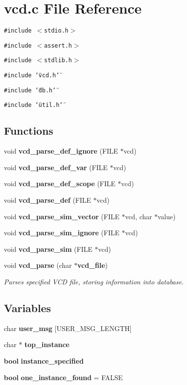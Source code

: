 \section{vcd.c File Reference}
\label{vcd_8c}
{\tt \#include $<$stdio.h$>$}\par
{\tt \#include $<$assert.h$>$}\par
{\tt \#include $<$stdlib.h$>$}\par
{\tt \#include \char`\"{}vcd.h\char`\"{}}\par
{\tt \#include \char`\"{}db.h\char`\"{}}\par
{\tt \#include \char`\"{}util.h\char`\"{}}\par
\subsection*{Functions}
\begin{CompactItemize}
\item 
void {\bf vcd\_\-parse\_\-def\_\-ignore} (FILE $\ast$vcd)
\item 
void {\bf vcd\_\-parse\_\-def\_\-var} (FILE $\ast$vcd)
\item 
void {\bf vcd\_\-parse\_\-def\_\-scope} (FILE $\ast$vcd)
\item 
void {\bf vcd\_\-parse\_\-def} (FILE $\ast$vcd)
\item 
void {\bf vcd\_\-parse\_\-sim\_\-vector} (FILE $\ast$vcd, char $\ast$value)
\item 
void {\bf vcd\_\-parse\_\-sim\_\-ignore} (FILE $\ast$vcd)
\item 
void {\bf vcd\_\-parse\_\-sim} (FILE $\ast$vcd)
\item 
void {\bf vcd\_\-parse} (char $\ast${\bf vcd\_\-file})
\begin{CompactList}\small\item\em Parses specified VCD file, storing information into database. \item\end{CompactList}\end{CompactItemize}
\subsection*{Variables}
\begin{CompactItemize}
\item 
char {\bf user\_\-msg} [USER\_\-MSG\_\-LENGTH]
\item 
char $\ast$ {\bf top\_\-instance}
\item 
{\bf bool} {\bf instance\_\-specified}
\item 
{\bf bool} {\bf one\_\-instance\_\-found} = FALSE
\end{CompactItemize}


